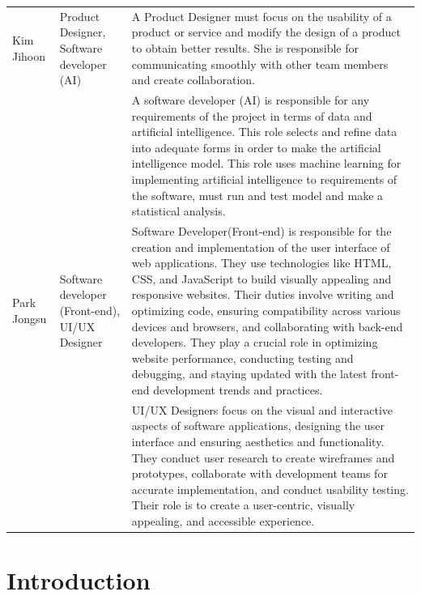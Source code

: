 \documentclass[conference]{IEEEtran}
\begin{document}
\begin{xtabular}{|p{1cm}|p{1.7cm}|p{5cm}|}
     \\ 
     \hline
     Kim Jihoon & Product Designer, Software developer (AI) & 
     A Product Designer must focus on the usability of a product or service and modify the design of a product to obtain better results. She is responsible for communicating smoothly with other team members and create collaboration.\\
    & &
     A software developer (AI) is responsible for any requirements of the project in terms of data and artificial intelligence. This role selects and refine data into adequate forms in order to make the artificial intelligence model. This role uses machine learning for implementing artificial intelligence to requirements of the software, must run and test model and make a statistical analysis.\\
     \hline
     Park Jongsu & Software developer (Front-end), UI/UX Designer & 
     Software Developer(Front-end) is responsible for the creation and implementation of the user interface of web applications. They use technologies like HTML, CSS, and JavaScript to build visually appealing and responsive websites. Their duties involve writing and optimizing code, ensuring compatibility across various devices and browsers, and collaborating with back-end developers. They play a crucial role in optimizing website performance, conducting testing and debugging, and staying updated with the latest front-end development trends and practices.\\
     & &
    UI/UX Designers focus on the visual and interactive aspects of software applications, designing the user interface and ensuring aesthetics and functionality. They conduct user research to create wireframes and prototypes, collaborate with development teams for accurate implementation, and conduct usability testing. Their role is to create a user-centric, visually appealing, and accessible experience.\\ [0.1ex] 
     \hline
\end{xtabular}

\section{Introduction}
\end{document}
